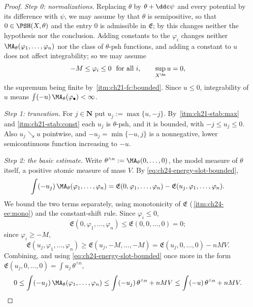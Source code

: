\begin{proof}
\emph{Step 0: normalizations.}  Replacing \(\theta\) by
\(\theta+\ddc\psi\) and every potential by its difference with \(\psi\), we
may assume by  that \(\theta\) is
semipositive, so that \(0\in\PSH(X,\theta)\) and the entry \(0\) is
admissible in \(\mathfrak E\); by
 this changes neither the hypothesis
nor the conclusion.  Adding constants to the \(\varphi_i\) changes neither
\(\MA_\theta(\varphi_1,\ldots,\varphi_n)\) nor the class of \(\theta\)-psh
functions, and adding a constant to \(u\) does not affect integrability; so
we may assume
\[
 -M\leq\varphi_i\leq0\ \text{ for all }i,
 \qquad \sup_{X^{\An}}u=0 ,
\]
the supremum being finite by
\,\cref{itm:ch21-fc:bounded}.  Since
\(u\leq0\), integrability of \(u\) means
\(\int(-u)\,\MA_\theta(\varphi_\bullet)<\infty\).

\emph{Step 1: truncation.}  For \(j\in\mathbf N\) put
\(u_j:=\max\{u,-j\}\).  By
\,\cref{itm:ch21-stab:max} and
\cref{itm:ch21-stab:const} each \(u_j\) is \(\theta\)-psh, and it is bounded,
with \(-j\leq u_j\leq0\).  Also \(u_j\searrow u\) pointwise, and
\(-u_j=\min\{-u,j\}\) is a nonnegative, lower semicontinuous function
increasing to \(-u\).

\emph{Step 2: the basic estimate.}  Write
\(\theta^{\wedge n}:=\MA_\theta(0,\ldots,0)\), the model measure of
\(\theta\) itself, a positive atomic measure of mass \(V\).  By
\eqref{eq:ch24-energy-slot-bounded},
\[
 \int(-u_j)\,\MA_\theta(\varphi_1,\ldots,\varphi_n)
 =\mathfrak E(0,\varphi_1,\ldots,\varphi_n)
  -\mathfrak E(u_j,\varphi_1,\ldots,\varphi_n).
\]
We bound the two terms separately, using monotonicity of \(\mathfrak E\)
(\,\cref{itm:ch24-ee:mono}) and the
constant-shift rule.  Since \(\varphi_i\leq0\),
\[
 \mathfrak E(0,\varphi_1,\ldots,\varphi_n)\leq\mathfrak E(0,0,\ldots,0)=0 ;
\]
since \(\varphi_i\geq-M\),
\[
 \mathfrak E(u_j,\varphi_1,\ldots,\varphi_n)
 \geq\mathfrak E(u_j,-M,\ldots,-M)
 =\mathfrak E(u_j,0,\ldots,0)-nMV .
\]
Combining, and using \eqref{eq:ch24-energy-slot-bounded} once more in the
form \(\mathfrak E(u_j,0,\ldots,0)=\int u_j\,\theta^{\wedge n}\),
\begin{equation}
\label{eq:ch24-integrability-estimate}
 0\leq\int(-u_j)\,\MA_\theta(\varphi_1,\ldots,\varphi_n)
 \leq\int(-u_j)\,\theta^{\wedge n}+nMV
 \leq\int(-u)\,\theta^{\wedge n}+nMV .
\end{equation}


\end{proof}
